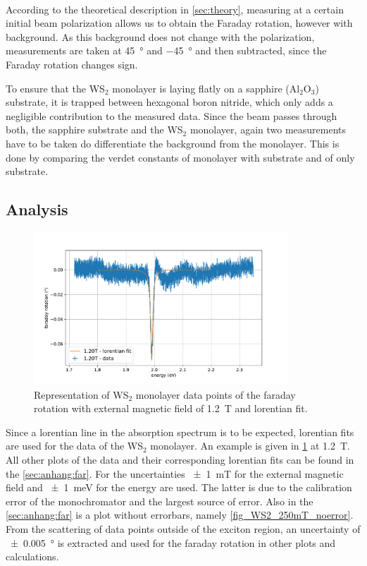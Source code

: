 \

According to the theoretical description in \cref{sec:theory}, measuring at a certain initial beam polarization allows us to obtain the Faraday rotation, however with background.
As this background does not change with the polarization, measurements are taken at \SI{+45}{\degree} and \SI{-45}{\degree} and then subtracted, since the Faraday rotation changes sign.

To ensure that the WS$_2$ monolayer is laying flatly on a sapphire ($\text{Al}_2\text{O}_3$) substrate, it is trapped between hexagonal boron nitride, which only adds a negligible contribution to the measured data.
Since the beam passes through both, the sapphire substrate and the WS$_2$ monolayer, again two measurements have to be taken do differentiate the background from the monolayer.
This is done by comparing the verdet constants of monolayer with substrate and of only substrate.

\subsection{Analysis}

\begin{figure}[!ht]
    \centering
    \includegraphics[width=0.85\textwidth]{plots/WS2_1200mT.pdf}
    \caption{Representation of WS$_2$ monolayer data points of the faraday rotation with external magnetic field of \SI{1.2}{\tesla} and lorentian fit.}
    \label{fig_WS2_1200mT}
\end{figure}
Since a lorentian line in the absorption spectrum is to be expected, lorentian fits are used for the data of the WS$_2$ monolayer.
An example is given in \cref{fig_WS2_1200mT} at \SI{1.2}{\tesla}.
All other plots of the data and their corresponding lorentian fits can be found in the \cref{sec:anhang:far}.
For the uncertainties \SI{+-1}{\milli\tesla} for the external magnetic field and \SI{+-1}{\milli\electronvolt} for the energy are used.
The latter is due to the calibration error of the monochromator and the largest source of error.
Also in the \cref{sec:anhang:far} is a plot without errorbars, namely \cref{fig_WS2_250mT_noerror}.
From the scattering of data points outside of the exciton region, an uncertainty of \SI{+-0.005}{\degree} is extracted and used for the faraday rotation in other plots and calculations.

